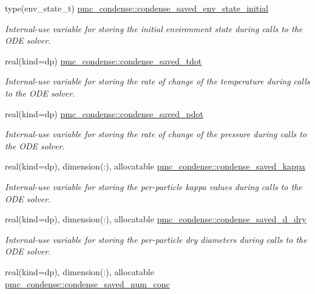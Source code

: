 \begin{DoxyCompactItemize}
type(env\+\_\+state\+\_\+t) \mbox{\hyperlink{namespacepmc__condense_af55aca988067bd27f35a3c34e2f5a4cd}{pmc\+\_\+condense\+::condense\+\_\+saved\+\_\+env\+\_\+state\+\_\+initial}}
\begin{DoxyCompactList}\small\item\em Internal-\/use variable for storing the initial environment state during calls to the O\+DE solver. \end{DoxyCompactList}\item 
real(kind=dp) \mbox{\hyperlink{namespacepmc__condense_a0a1155d88faa2b061fd371090165aad1}{pmc\+\_\+condense\+::condense\+\_\+saved\+\_\+tdot}}
\begin{DoxyCompactList}\small\item\em Internal-\/use variable for storing the rate of change of the temperature during calls to the O\+DE solver. \end{DoxyCompactList}\item 
real(kind=dp) \mbox{\hyperlink{namespacepmc__condense_a5bdbeab5c023573ed2f0a37bfa718f83}{pmc\+\_\+condense\+::condense\+\_\+saved\+\_\+pdot}}
\begin{DoxyCompactList}\small\item\em Internal-\/use variable for storing the rate of change of the pressure during calls to the O\+DE solver. \end{DoxyCompactList}\item 
real(kind=dp), dimension(\+:), allocatable \mbox{\hyperlink{namespacepmc__condense_a0829dc0e51b0c9843bfd0e3c36432a19}{pmc\+\_\+condense\+::condense\+\_\+saved\+\_\+kappa}}
\begin{DoxyCompactList}\small\item\em Internal-\/use variable for storing the per-\/particle kappa values during calls to the O\+DE solver. \end{DoxyCompactList}\item 
real(kind=dp), dimension(\+:), allocatable \mbox{\hyperlink{namespacepmc__condense_a30c34390a80570ea680b53c2ab971b50}{pmc\+\_\+condense\+::condense\+\_\+saved\+\_\+d\+\_\+dry}}
\begin{DoxyCompactList}\small\item\em Internal-\/use variable for storing the per-\/particle dry diameters during calls to the O\+DE solver. \end{DoxyCompactList}\item 
real(kind=dp), dimension(\+:), allocatable \mbox{\hyperlink{namespacepmc__condense_ae5922bfbd484efd47db5593f15d0c0f4}{pmc\+\_\+condense\+::condense\+\_\+saved\+\_\+num\+\_\+conc}}

\end{DoxyCompactItemize}
